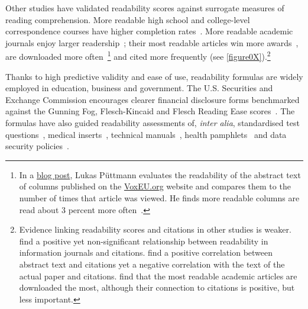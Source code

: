 

Other studies have validated readability scores against surrogate measures of reading comprehension. More readable high school and college-level correspondence courses have higher completion rates~\citep{Klare1973}. More readable academic journals enjoy larger readership~\citep{Richardson1977,Swanson1948}; their most readable articles win more awards~\citep{Sawyer2008}, are downloaded more often~\citep{Guerini2012}\footnote{In a \href{http://lukaspuettmann.com/2017/12/09/voxeu-gobbledygook/}{blog post}, Lukas Püttmann evaluates the readability of the abstract text of columns published on the \href{http://www.voxeu.org}{VoxEU.org} website and compares them to the number of times that article was viewed. He finds more readable columns are read about 3 percent more often~\citep{Puttmann2017}.} and cited more frequently (see \autoref{figure0X}).\footnote{Evidence linking readability scores and citations in other studies is weaker.  \citet{Lei2016} find a positive yet non-significant relationship between readability in information journals and citations.  \citet{Berninger2017} find a positive correlation between abstract text and citations yet a negative correlation with the text of the actual paper and citations.  \citet{Guerini2012} find that the most readable academic articles are downloaded the most, although their connection to citations is positive, but less important.}

Thanks to high predictive validity and ease of use, readability formulas are widely employed in education, business and government. The U.S. Securities and Exchange Commission encourages clearer financial disclosure forms benchmarked against the Gunning Fog, Flesch-Kincaid and Flesch Reading Ease scores~\citep{Cox2007}. The formulas have also guided readability assessments of, \emph{inter alia}, standardised test questions~\citep{Chall1977,Chall1983}, medical inserts~\citep[\emph{e.g.},][]{Wallace2008}, technical manuals~\citep[\emph{e.g.},][]{Hussin2012,Klare1973}, health pamphlets~\citep[\emph{e.g.},][]{Foster2002,Meade1989} and data security policies~\citep{Alkhurayyif2017}.

